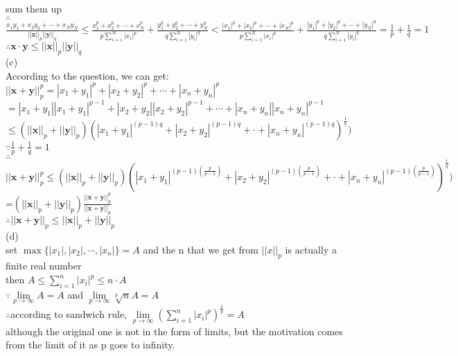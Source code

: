 \documentclass{article}
\begin{document}
sum them up\\

$\therefore$\qquad$\displaystyle\frac{x_1y_1+x_2y_2+\cdots+x_Ny_N}{||\textbf{x}||_p||\textbf{y}||_q}\leq\frac{x_1^p+x_2^p+\cdots+x_N^p}{p\sum \limits_{i=1}^N|x_i|^p}+\frac{y_1^q+y_2^q+\cdots+y_N^q}{q\sum \limits_{i=1}^N|y_i|^q}<\frac{|x_1|^p+|x_2|^p+\cdots+|x_N|^p}{p\sum \limits_{i=1}^N|x_i|^p}+\frac{|y_1|^q+|y_2|^q+\cdots+|y_N|^q}{q\sum \limits_{i=1}^N|y_i|^q}=\frac{1}{p}+\frac{1}{q}=1$\\

$\therefore$\qquad$\textbf{x}\cdot\textbf{y}\leq||\textbf{x}||_p||\textbf{y}||_q$\\

(c)\\

According to the question, we can get:\\

$||\textbf{x}+\textbf{y}||_p^p=|x_1+y_1|^p+|x_2+y_2|^p+\cdots+|x_n+y_n|^p$\\

\qquad\qquad$=|x_1+y_1||x_1+y_1|^{p-1}+|x_2+y_2||x_2+y_2|^{p-1}+\cdots+|x_n+y_n||x_n+y_n|^{p-1}$\\

\qquad\qquad$\leq(||\textbf{x}||_p+||\textbf{y}||_p)(|x_1+y_1|^{(p-1)q}+|x_2+y_2|^{(p-1)q}+\cdot+|x_n+y_n|^{(p-1)q})^{\frac{1}{q}})$\\

$\because$\qquad$\displaystyle\frac{1}{p}+\frac{1}{q}=1$\\

$\therefore$\qquad$||\textbf{x}+\textbf{y}||_p^p\leq(||\textbf{x}||_p+||\textbf{y}||_p)(|x_1+y_1|^{(p-1)\left(\frac{p}{p-1}\right)}+|x_2+y_2|^{(p-1)\left(\frac{p}{p-1}\right)}+\cdot+|x_n+y_n|^{(p-1)\left(\frac{p}{p-1}\right)})^{\frac{1}{q}})$\\

\qquad\qquad=$(||\textbf{x}||_p+||\textbf{y}||_p)\displaystyle\frac{||\textbf{x}+\textbf{y}||^p_p}{||\textbf{x}+\textbf{y}||_p}$\\

$\therefore$\qquad$||\textbf{x}+\textbf{y}||_p\leq||\textbf{x}||_p+||\textbf{y}||_p$\\

(d)\\

set $\max\{|x_1|, |x_2|, \cdots, |x_n|\}=A$ and the n that we get from $||x||_p$ is actually a finite real number\\

then $A\leq\sum \limits_{i=1}^n|x_i|^p\leq n\cdot A$\\

$\because$\qquad$\lim \limits_{p \to \infty}A=A$ and $\lim \limits_{p \to \infty}\sqrt[p]{n}A=A$\\

$\therefore$\qquad according to sandwich rule, $\lim \limits_{p \to \infty}\left(\sum \limits_{i=1}^n|x_i|^p\right)^{\frac{1}{p}}=A$\\

although the original one is not in the form of limits, but the motivation comes from the limit of it as p goes to infinity.\\
\end{document}
